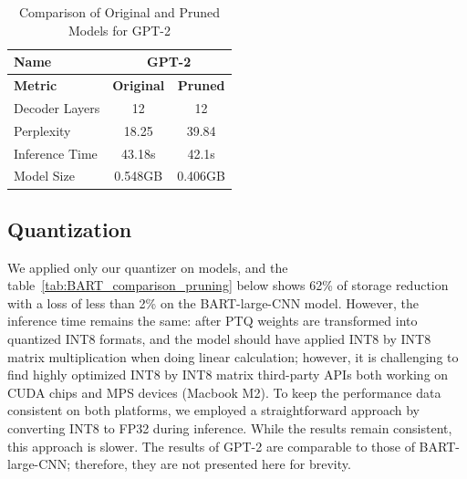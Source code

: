 \documentclass{article}
\begin{document}
    \begin{table}[h!]
        \centering
        \begin{tabular}{lcc}
            \toprule
            \textbf{Name}         & \multicolumn{2}{c}{\textbf{GPT-2}} \\ \midrule
            \textbf{Metric}       & \textbf{Original} & \textbf{Pruned} \\ \midrule
            Decoder Layers        & 12                     & 12                     \\
            Perplexity            & 18.25                  & 39.84                  \\
            Inference Time        & 43.18s                 & 42.1s                  \\
            Model Size            & 0.548GB                & 0.406GB                \\ \bottomrule
        \end{tabular}
        \caption{Comparison of Original and Pruned Models for GPT-2}
        \label{tab:gpt2_comparison_pruning}
    \end{table}

    \subsection{Quantization}

    \hspace*{1em} We applied only our quantizer on models, and the table~\ref{tab:BART_comparison_pruning} below shows 62\% of storage reduction with a loss of less than 2\% on the BART-large-CNN model. However, the inference time remains the same: after PTQ weights are transformed into quantized INT8 formats, and the model should have applied INT8 by INT8 matrix multiplication when doing linear calculation; however, it is challenging to find highly optimized INT8 by INT8 matrix third-party APIs both working on CUDA chips and MPS devices (Macbook M2). To keep the performance data consistent on both platforms, we employed a straightforward approach by converting INT8 to FP32 during inference. While the results remain consistent, this approach is slower. The results of GPT-2 are comparable to those of BART-large-CNN; therefore, they are not presented here for brevity.
\end{document}
